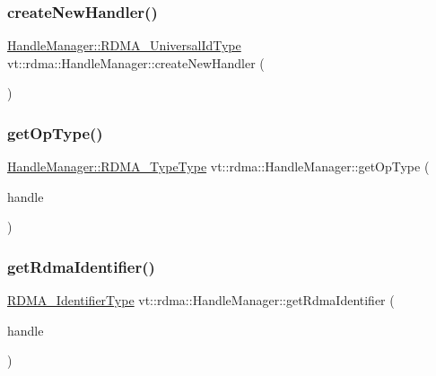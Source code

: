 \subsubsection{\texorpdfstring{create\+New\+Handler()}{createNewHandler()}}
{\footnotesize\ttfamily \hyperlink{structvt_1_1rdma_1_1_handle_manager_acebfe9aa5887a015cc5da18f4f7e55ae}{Handle\+Manager\+::\+R\+D\+M\+A\+\_\+\+Universal\+Id\+Type} vt\+::rdma\+::\+Handle\+Manager\+::create\+New\+Handler (\begin{DoxyParamCaption}{ }\end{DoxyParamCaption})\hspace{0.3cm}{\ttfamily [static]}}

\mbox{\label{structvt_1_1rdma_1_1_handle_manager_a9587289289345a60a93f7c1de730880c}} 
\subsubsection{\texorpdfstring{get\+Op\+Type()}{getOpType()}}
{\footnotesize\ttfamily \hyperlink{namespacevt_1_1rdma_ac848e1d9da43db6294bd06f83e5d3946}{Handle\+Manager\+::\+R\+D\+M\+A\+\_\+\+Type\+Type} vt\+::rdma\+::\+Handle\+Manager\+::get\+Op\+Type (\begin{DoxyParamCaption}\item[{\hyperlink{structvt_1_1rdma_1_1_handle_manager_acebfe9aa5887a015cc5da18f4f7e55ae}{R\+D\+M\+A\+\_\+\+Universal\+Id\+Type} const \&}]{handle }\end{DoxyParamCaption})\hspace{0.3cm}{\ttfamily [static]}}

\mbox{\label{structvt_1_1rdma_1_1_handle_manager_ad6f12c5af90a234af9bd717afd523a41}} 
\subsubsection{\texorpdfstring{get\+Rdma\+Identifier()}{getRdmaIdentifier()}}
{\footnotesize\ttfamily \hyperlink{namespacevt_1_1rdma_a3b7f2eba1e9063a37d9301061c1432f1}{R\+D\+M\+A\+\_\+\+Identifier\+Type} vt\+::rdma\+::\+Handle\+Manager\+::get\+Rdma\+Identifier (\begin{DoxyParamCaption}\item[{\hyperlink{structvt_1_1rdma_1_1_handle_manager_acebfe9aa5887a015cc5da18f4f7e55ae}{R\+D\+M\+A\+\_\+\+Universal\+Id\+Type} const \&}]{handle }\end{DoxyParamCaption})\hspace{0.3cm}{\ttfamily [static]}}

